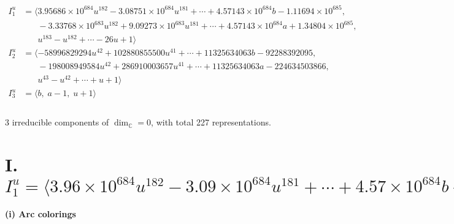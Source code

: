 \documentclass[1p]{elsarticle_modified}
\theoremstyle{definition}
\begin{document}
\begin{align*}
I^u_{1}&=\langle 
3.95686\times10^{684} u^{182}-3.08751\times10^{684} u^{181}+\cdots+4.57143\times10^{684} b-1.11694\times10^{685},\\
\phantom{I^u_{1}}&\phantom{= \langle  }-3.33768\times10^{683} u^{182}+9.09273\times10^{683} u^{181}+\cdots+4.57143\times10^{684} a+1.34804\times10^{685},\\
\phantom{I^u_{1}}&\phantom{= \langle  }u^{183}- u^{182}+\cdots-26 u+1\rangle \\
I^u_{2}&=\langle 
-58996829294 u^{42}+102880855500 u^{41}+\cdots+11325634063 b-92288392095,\\
\phantom{I^u_{2}}&\phantom{= \langle  }-198008949584 u^{42}+286910003657 u^{41}+\cdots+11325634063 a-224634503866,\\
\phantom{I^u_{2}}&\phantom{= \langle  }u^{43}- u^{42}+\cdots+u+1\rangle \\
I^u_{3}&=\langle 
b,\;a-1,\;u+1\rangle \\
\\
\end{align*}
\raggedright * 3 irreducible components of $\dim_{\mathbb{C}}=0$, with total 227 representations.\\
\newpage
\renewcommand{\arraystretch}{1}
\centering \section*{I. $I^u_{1}= \langle 3.96\times10^{684} u^{182}-3.09\times10^{684} u^{181}+\cdots+4.57\times10^{684} b-1.12\times10^{685},\;-3.34\times10^{683} u^{182}+9.09\times10^{683} u^{181}+\cdots+4.57\times10^{684} a+1.35\times10^{685},\;u^{183}- u^{182}+\cdots-26 u+1 \rangle$}
\flushleft \textbf{(i) Arc colorings}\\
\end{document}
